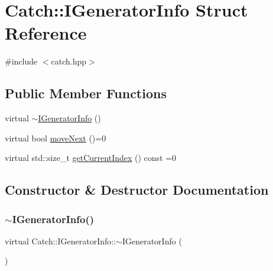 \hypertarget{struct_catch_1_1_i_generator_info}{}\section{Catch\+:\+:I\+Generator\+Info Struct Reference}
\label{struct_catch_1_1_i_generator_info}


{\ttfamily \#include $<$catch.\+hpp$>$}

\subsection*{Public Member Functions}
\begin{DoxyCompactItemize}
\item 
virtual \mbox{\hyperlink{struct_catch_1_1_i_generator_info_a9266aa62993298510c2a8b5948abb8e6}{$\sim$\+I\+Generator\+Info}} ()
\item 
virtual bool \mbox{\hyperlink{struct_catch_1_1_i_generator_info_a2b86711ca7009903edfe27ed62b515ef}{move\+Next}} ()=0
\item 
virtual std\+::size\+\_\+t \mbox{\hyperlink{struct_catch_1_1_i_generator_info_a6a0dca712d31f6849fd9447b1344673a}{get\+Current\+Index}} () const =0
\end{DoxyCompactItemize}


\subsection{Constructor \& Destructor Documentation}
\mbox{\label{struct_catch_1_1_i_generator_info_a9266aa62993298510c2a8b5948abb8e6}} 
\subsubsection{\texorpdfstring{$\sim$\+I\+Generator\+Info()}{~IGeneratorInfo()}}
{\footnotesize\ttfamily virtual Catch\+::\+I\+Generator\+Info\+::$\sim$\+I\+Generator\+Info (\begin{DoxyParamCaption}{ }\end{DoxyParamCaption})\hspace{0.3cm}{\ttfamily [virtual]}}



